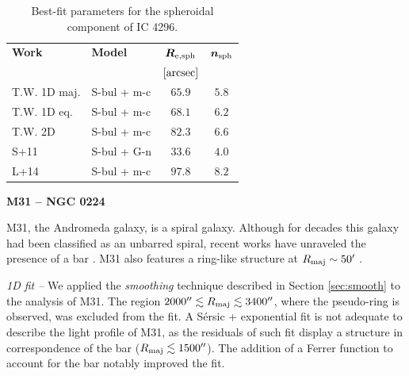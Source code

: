 \documentclass[preprint2]{emulateapj}
\begin{document}
  \begin{table}[h]
  \small
  \caption{Best-fit parameters for the spheroidal component of IC 4296.}
  \begin{center}
  \begin{tabular}{llcc}
  \hline
  {\bf Work} & {\bf Model}   & $\bm R_{\rm e,sph}$    & $\bm n_{\rm sph}$ \\
    &  &  $[\rm arcsec]$ & \\
  \hline
  T.W. 1D maj. & S-bul + m-c & $65.9$  &  $5.8$ \\
  T.W. 1D eq.  & S-bul + m-c & $68.1$  &  $6.2$ \\
  T.W. 2D      & S-bul + m-c & $82.3$  &  $6.6$ \\
  \hline
  S+11         & S-bul + G-n & $33.6$  &  $4.0$ \\
  L+14         & S-bul + m-c & $97.8$  &  $8.2$ \\
  \hline
  \end{tabular}
  \end{center}
  \label{tab:ic4296}
  \end{table}

  \clearpage\newpage\noindent
  {\bf M31 -- NGC 0224 \\}

  M31, the Andromeda galaxy, is a spiral galaxy. 
  Although for decades this galaxy had been classified as an unbarred spiral,
  recent works have unraveled the presence of a bar \citep{athanassoulabeaton2006m31,beaton2007m31,morrison2011m31}.
  M31 also features a ring-like structure at $R_{\rm maj} \sim 50'$ \citep{athanassoulabeaton2006m31}. 


  \emph{1D fit -- }
  We applied the \emph{smoothing} technique described in Section \ref{sec:smooth} to the analysis of M31.
  The region $2000'' \lesssim R_{\rm maj} \lesssim 3400''$, where the pseudo-ring is observed, was excluded from the fit.
  A S\'ersic + exponential fit is not adequate to describe the light profile of M31,
  as the residuals of such fit display a structure in correspondence of the bar ($R_{\rm maj} \lesssim 1500''$).
  The addition of a Ferrer function to account for the bar notably improved the fit.
\end{document}
